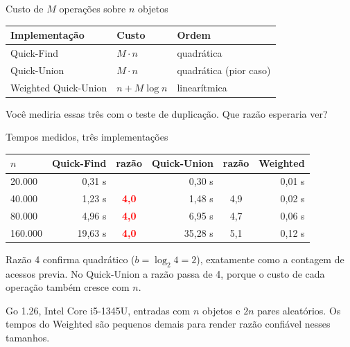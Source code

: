 \documentclass{beamer}
\newcommand{\hl}[1]{\textcolor{red}{\textbf{#1}}}
\begin{document}
\begin{frame}{Custo de $M$ operações sobre $n$ objetos}
	\begin{center}
		\begin{tabular}{@{}lll@{}}
			\toprule
			Implementação        & Custo         & Ordem                  \\
			\midrule
			Quick-Find           & $M \cdot n$   & quadrática             \\
			Quick-Union          & $M \cdot n$   & quadrática (pior caso) \\
			Weighted Quick-Union & $n + M\log n$ & linearítmica           \\
			\bottomrule
		\end{tabular}
	\end{center}

	\vspace{0.5cm}
	\begin{center}
		\Large Você mediria essas três com o teste de duplicação. Que razão
		esperaria ver?
	\end{center}
\end{frame}

\begin{frame}{Tempos medidos, três implementações}
	\begin{center}
		\small
		\begin{tabular}{@{}lrcrcr@{}}
			\toprule
			$n$     & Quick-Find & razão    & Quick-Union & razão & Weighted \\
			\midrule
			20.000  & 0,31 s     &          & 0,30 s      &       & 0,01 s   \\
			40.000  & 1,23 s     & \hl{4,0} & 1,48 s      & 4,9   & 0,02 s   \\
			80.000  & 4,96 s     & \hl{4,0} & 6,95 s      & 4,7   & 0,06 s   \\
			160.000 & 19,63 s    & \hl{4,0} & 35,28 s     & 5,1   & 0,12 s   \\
			\bottomrule
		\end{tabular}
	\end{center}

	\vspace{0.3cm}
	Razão 4 confirma quadrático ($b = \log_2 4 = 2$), exatamente como a contagem
	de acessos previa. No Quick-Union a razão passa de 4, porque o custo de cada
	operação também cresce com $n$.

	\vspace{0.2cm}
	\footnotesize Go 1.26, Intel Core i5-1345U, entradas com $n$ objetos e $2n$
	pares aleatórios. Os tempos do Weighted são pequenos demais para render
	razão confiável nesses tamanhos.
\end{frame}
\end{document}
